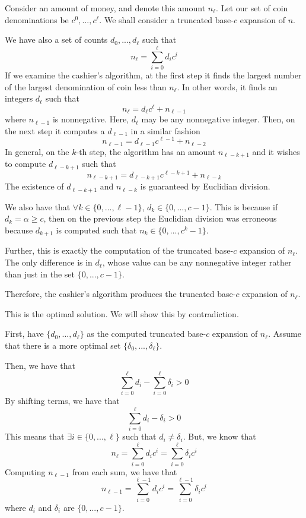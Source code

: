 \documentclass[12pt]{article}
\begin{document}
\begin{enumerate}
\begin{enumerate}
	Consider an amount of money, and denote this amount $n_{\ell}$. Let our set of coin denominations be $c^0,...,c^{\ell}$. We shall consider a truncated base-$c$ expansion of $n$.
	
	We have also a set of counts $d_0,...,d_{\ell}$ such that 
	\[
	n_{\ell} = \sum_{i=0}^{\ell} d_i c^i
	\]
	If we examine the cashier's algorithm, at the first step it finds the largest number of the largest denomination of coin less than $n_{\ell}$. In other words, it finds an integers $d_{\ell}$ such that 
	\[
	n_{\ell} = d_{\ell} c^{\ell} + n_{\ell-1}
	\]
	where $n_{\ell-1}$ is nonnegative. Here, $d_{\ell}$ may be any nonnegative integer.
	Then, on the next step it computes a $d_{\ell-1}$ in a similar fashion
	\[
	n_{\ell-1} = d_{\ell-1} c^{\ell-1} + n_{\ell-2}
	\]
	In general, on the $k$-th step, the algorithm has an amount $n_{\ell-k+1}$ and it wishes to compute $d_{\ell-k+1}$ such that 
	\[
	n_{\ell-k+1} = d_{\ell-k+1} c^{\ell-k+1} + n_{\ell-k}
	\]
	The existence of $d_{\ell-k+1}$ and $n_{\ell-k}$ is guaranteed by Euclidian division.
	
	We also have that $\forall k \in \{0,...,\ell-1\}$, $d_k \in \{0,...,c-1\}$. This is because if $d_k = \alpha \geq c$, then on the previous step the Euclidian division was erroneous because $d_{k+1}$ is computed such that 
$n_k\in\{0,...,c^k-1\}$.
	
	Further, this is exactly the computation of the truncated base-$c$ expansion of $n_{\ell}$. The only difference is in $d_{\ell}$, whose value can be any nonnegative integer rather than just in the set $\{0,...,c-1\}$.
	
	Therefore, the cashier's algorithm produces the truncated base-$c$ expansion of $n_{\ell}$.
	
	This is the optimal solution. We will show this by contradiction.
	
	First, have $\{d_0,...,d_{\ell}\}$ as the computed truncated base-$c$ expansion of $n_{\ell}$. Assume that there is a more optimal set $\{\delta_0,...,\delta_{\ell}\}$.
	
	Then, we have that 
	\[
	\sum_{i=0}^{\ell} d_i -\sum_{i=0}^{\ell} \delta_i > 0
	\]
	By shifting terms, we have that
	\[
	\sum_{i=0}^{\ell} d_i - \delta_i > 0
	\]
	This means that $\exists i\in\{0,...,\ell\}$ such that $d_i\neq \delta_i$.
	But, we know that 
	\[
	n_{\ell} = \sum_{i=0}^{\ell} d_i c^i = \sum_{i=0}^{\ell} \delta_i c^i
	\]
	Computing $n_{\ell-1}$ from each sum, we have that 
	\[
	n_{\ell-1} = \sum_{i=0}^{\ell-1} d_i c^i = \sum_{i=0}^{\ell-1} \delta_i c^i
    \]
    where $d_i$ and $\delta_i$ are $\{0,...,c-1\}$.
    

\end{enumerate}
\end{enumerate}
\end{document}
